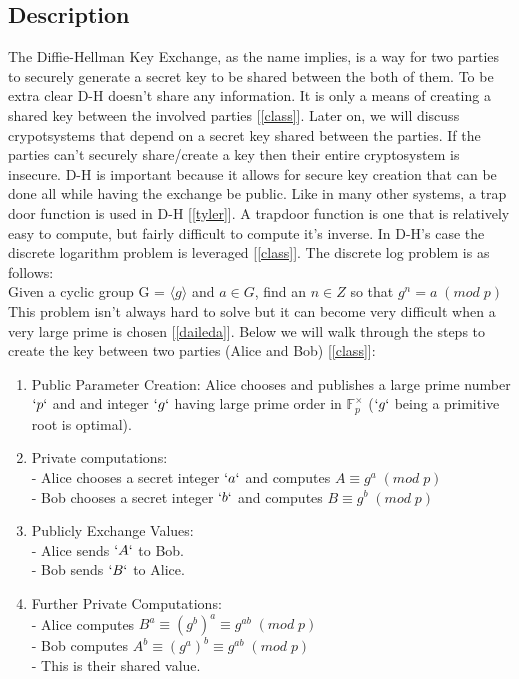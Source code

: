 \documentclass[12pt]{article}
\begin{document}
\subsection{Description}
The Diffie-Hellman Key Exchange, as the name implies, is a way for two parties to securely generate a secret key to be shared between the both of them. To be extra clear D-H doesn't share any information. It is only a means of creating a shared key between the involved parties [\ref{class}]. Later on, we will discuss crypotsystems that depend on a secret key shared between the parties. If the parties can't securely share/create a key then their entire cryptosystem is insecure. D-H is important because it allows for secure key creation that can be done all while having the exchange be public. Like in many other systems, a trap door function is used in D-H [\ref{tyler}]. A trapdoor function is one that is relatively easy to compute, but fairly difficult to compute it's inverse. In D-H's case the discrete logarithm problem is leveraged [\ref{class}]. The discrete log problem is as follows:
\vspace{3mm}\\
Given a cyclic group G = $\langle g \rangle$ and $a \in G$, find an $n \in Z$ so that $g^n = a\;(mod\;p)$
\vspace{.5mm}\\
This problem isn't always hard to solve but it can become very difficult when a very large prime is chosen [\ref{daileda}]. Below we will walk through the steps to create the key between two parties (Alice and Bob) [\ref{class}]: \\
\begin{enumerate}
  \item Public Parameter Creation: Alice chooses and publishes a large prime number $`p`$ and and integer $`g`$ having large prime order in $\mathbb{F}_p^{\times}$ ($`g`$ being a primitive root is optimal).
  \item Private computations: \\
    - Alice chooses a secret integer $`a`$ and computes $A\equiv g^a\;(mod\;p)$\\
    - Bob chooses a secret integer $`b`$ and computes $B\equiv g^b\;(mod\;p)$\\
  \item Publicly Exchange Values:\\
  - Alice sends $`A`$ to Bob.\\
  - Bob sends $`B`$ to Alice.
  \item Further Private Computations:\\
  - Alice computes $B^a \equiv {(g^b)}^a \equiv g^{ab}\;(mod\;p)$\\
  - Bob computes $A^b \equiv {(g^a)}^b \equiv g^{ab}\;(mod\;p)$ \\
  - This is their shared value.
\end{enumerate}
\end{document}
